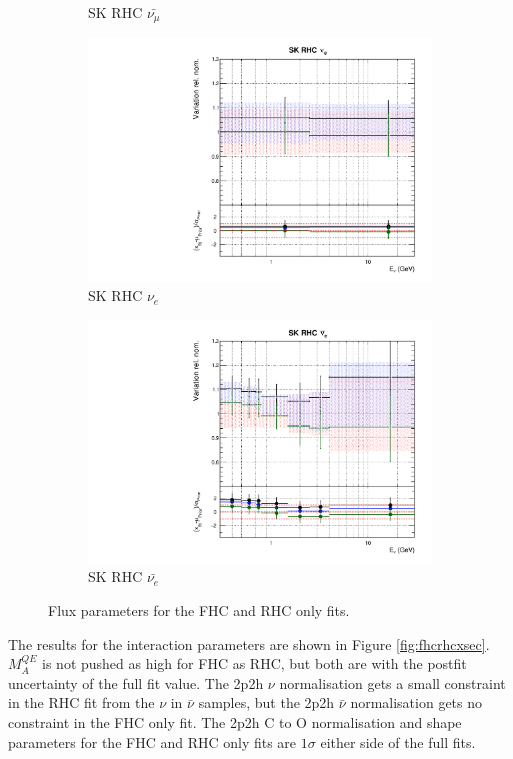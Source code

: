 \begin{figure}
\begin{subfigure}{0.24\textwidth}
  \caption{SK RHC $\bar{\nu_{\mu}}$}
\end{subfigure}
\begin{subfigure}{0.24\textwidth}
  \centering
  \includegraphics[width=0.95\linewidth]{figs/fhcrhcfitsflux_14}
  \caption{SK RHC $\nu_{e}$}
\end{subfigure}
\begin{subfigure}{0.24\textwidth}
  \centering
  \includegraphics[width=0.95\linewidth]{figs/fhcrhcfitsflux_15}
  \caption{SK RHC $\bar{\nu_e}$}
\end{subfigure}
\caption{Flux parameters for the FHC and RHC only fits.}
\label{fig:fhcrhcflux}
\end{figure}

The results for the interaction parameters are shown in Figure \ref{fig:fhcrhcxsec}. $M_{A}^{QE}$ is not pushed as high for FHC as RHC, but both are with the postfit uncertainty of the full fit value. The 2p2h $\nu$ normalisation gets a small constraint in the RHC fit from the $\nu$ in $\bar{\nu}$ samples, but the 2p2h $\bar{\nu}$ normalisation gets no constraint in the FHC only fit. The 2p2h C to O normalisation and shape parameters for the FHC and RHC only fits are $1\sigma$ either side of the full fits. 

